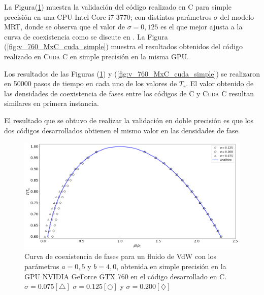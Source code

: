 La Figura(\ref{fig:v_760_MxC_c_simple}) muestra la validación del código realizado en \textsc{C} para simple precisión en una CPU Intel Core i7-3770; con distintos parámetros $\sigma$ del modelo MRT, donde se observa que el valor de $\sigma = 0,125$ es el que mejor ajusta a la curva de coexistencia como se discute en \cite{fogliatto2018modelado}. La Figura (\ref{fig:v_760_MxC_cuda_simple}) muestra el resultados obtenidos del código realizado en \textsc{Cuda C} en simple precisión en la misma GPU.

Los resultados de las Figuras (\ref{fig:v_760_MxC_c_simple}) y (\ref{fig:v_760_MxC_cuda_simple}) se realizaron en 50000 pasos de tiempo en cada uno de los valores de $T_r$. El valor obtenido de las densidades de coexistencia de fases entre los códigos de \textsc{C} y \textsc{Cuda C} resultan similares en primera instancia. 

El resultado que se obtuvo de realizar la validación en doble precisión es que los dos códigos desarrollados obtienen el mismo valor en las densidades de fase.

\begin{figure}[h!]
	\centering
	\includegraphics[width=\textwidth]{figs/cap4/v_760_MxC_c_simple}
	\caption{Curva de coexistencia de fases para un fluido de VdW con los parámetros $a = 0,5 $ y $b = 4,0 $, obtenida en simple precisión en la GPU NVIDIA GeForce GTX 760 en el código desarrollado en \textsc{C}. $\sigma = 0.075[\bigtriangleup]$	 $\sigma = 0.125[\bigcirc]$ y $\sigma = 0.200[\diamondsuit]$ }
 	\label{fig:v_760_MxC_c_simple}	
\end{figure}

